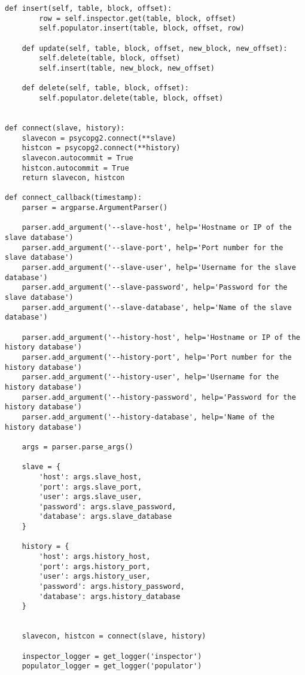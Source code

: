 \begin{lstlisting}[caption={history.py}]
    def insert(self, table, block, offset):
        row = self.inspector.get(table, block, offset)
        self.populator.insert(table, block, offset, row)

    def update(self, table, block, offset, new_block, new_offset):
        self.delete(table, block, offset)
        self.insert(table, new_block, new_offset)

    def delete(self, table, block, offset):
        self.populator.delete(table, block, offset)


def connect(slave, history):
    slavecon = psycopg2.connect(**slave)
    histcon = psycopg2.connect(**history)
    slavecon.autocommit = True
    histcon.autocommit = True
    return slavecon, histcon

def connect_callback(timestamp):
    parser = argparse.ArgumentParser()

    parser.add_argument('--slave-host', help='Hostname or IP of the slave database')
    parser.add_argument('--slave-port', help='Port number for the slave database')
    parser.add_argument('--slave-user', help='Username for the slave database')
    parser.add_argument('--slave-password', help='Password for the slave database')
    parser.add_argument('--slave-database', help='Name of the slave database')

    parser.add_argument('--history-host', help='Hostname or IP of the history database')
    parser.add_argument('--history-port', help='Port number for the history database')
    parser.add_argument('--history-user', help='Username for the history database')
    parser.add_argument('--history-password', help='Password for the history database')
    parser.add_argument('--history-database', help='Name of the history database')

    args = parser.parse_args()

    slave = {
        'host': args.slave_host,
        'port': args.slave_port,
        'user': args.slave_user,
        'password': args.slave_password,
        'database': args.slave_database
    }

    history = {
        'host': args.history_host,
        'port': args.history_port,
        'user': args.history_user,
        'password': args.history_password,
        'database': args.history_database
    }


    slavecon, histcon = connect(slave, history)

    inspector_logger = get_logger('inspector')
    populator_logger = get_logger('populator')


\end{lstlisting}
